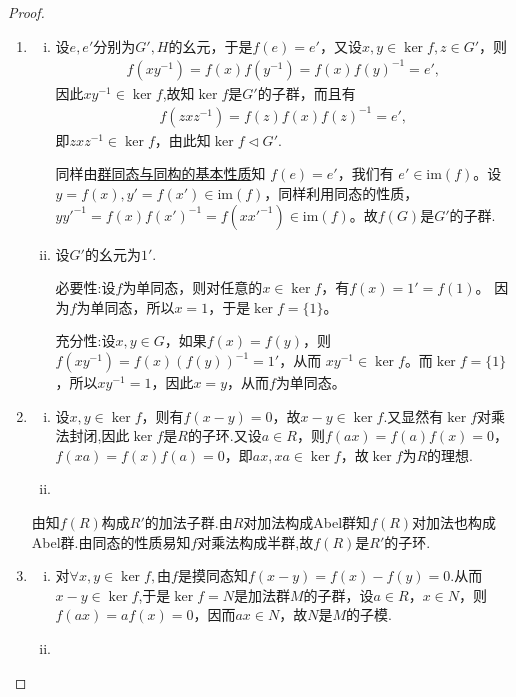 \documentclass[../../main.tex]{subfiles}%
\begin{document}
\begin{proof}
\begin{enumerate}[(1)]
\item \begin{enumerate}[(i)]
\item 设$e, e'$分别为$G', H$的幺元，于是$f(e) = e'$，又设$x, y \in \ker f, z \in G'$，则
\begin{align*}
f(xy^{-1}) = f(x)f(y^{-1}) = f(x)f(y)^{-1} = e',
\end{align*}
因此$xy^{-1}\in \ker f$,故知$\ker f$是$G'$的子群，而且有
\begin{align*}
f(zxz^{-1}) = f(z)f(x)f(z)^{-1} = e',
\end{align*}
即$zxz^{-1} \in \ker f$，由此知$\ker f \lhd G'$.

同样由\hyperref[theorem:群同态与同构的基本性质]{群同态与同构的基本性质}知 $f(e)=e'$，我们有 $e'\in\mathrm{im}(f)$。设 $y = f(x),y' = f(x')\in\mathrm{im}(f)$，同样利用同态的性质，$yy'^{-1}=f(x)f(x')^{-1}=f(xx'^{-1})\in\mathrm{im}(f)$。故$f(G)$是$G'$的子群.

\item 设$G'$的幺元为$1'$.

{\heiti 必要性:}设$f$为单同态，则对任意的$x\in\ker f$，有$f(x)=1'=f(1)$。
因为$f$为单同态，所以$x=1$，于是$\ker f=\{1\}$。

{\heiti 充分性:}设$x,y\in G$，如果$f(x)=f(y)$，则$f(xy^{-1})=f(x)(f(y))^{-1}=1'$，从而
$xy^{-1}\in\ker f$。而$\ker f=\{1\}$，所以$xy^{-1}=1$，因此$x=y$，从而$f$为单同态。
\end{enumerate}

\item \begin{enumerate}[(i)]
\item 设$x,y \in \ker f$，则有$f(x - y) = 0$，故$x - y \in \ker f$.又显然有$\ker f$对乘法封闭,因此$\ker f$是$R$的子环.又设$a \in R$，则$f(ax) = f(a)f(x) = 0$，$f(xa) = f(x)f(a) = 0$，即$ax, xa \in \ker f$，故$\ker f$为$R$的理想.

\item 
\end{enumerate}

由知$f(R)$构成$R'$的加法子群.由$R$对加法构成Abel群知$f(R)$对加法也构成Abel群.由同态的性质易知$f$对乘法构成半群,故$f(R)$是$R'$的子环.

\item \begin{enumerate}[(i)]
\item 对$\forall x,y\in \ker f,$由$f$是摸同态知$f(x-y)=f(x)-f(y)=0$.从而$x-y\in \ker f$,于是$\ker f = N$是加法群$M$的子群，设$a \in R$，$x \in N$，则$f(ax) = af(x) = 0$，因而$ax \in N$，故$N$是$M$的子模. 

\item 
\end{enumerate}
\end{enumerate}
\end{proof}
\end{document}
